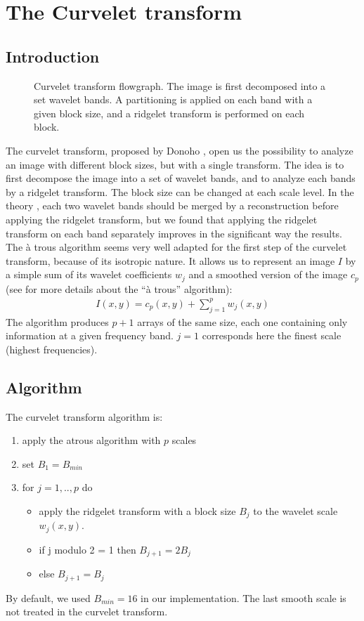 \documentclass[11pt,a4paper]{article}
\begin{document}
\section{The Curvelet transform}
\subsection{Introduction}
\begin{figure}[htb]
\centerline{
\hbox{}}
\caption{Curvelet transform flowgraph. The image 
is first decomposed into a set wavelet bands. A partitioning
is applied on each band with a given block size, and a ridgelet transform
is performed on each block.}
\label{fig_curvelet}
\end{figure}

The curvelet transform, proposed by Donoho \cite{cur:donoho99,cur:candes99_3},
open us the possibility to analyze an image with different block sizes, but
with a single transform. The idea is to first decompose the image into
a set of wavelet bands, and to analyze each bands by a ridgelet transform.
The block size can be changed at each scale level. 
In the theory \cite{cur:donoho99}, each two wavelet bands should be merged
by a reconstruction before applying the ridgelet transform, but we found 
that applying the ridgelet transform on each band separately improves
in the significant way the results. The \`a trous algorithm seems very well
adapted for the first step of the curvelet transform, because of its 
isotropic nature. It allows us to represent an
image $I$ by a simple sum of its wavelet coefficients $w_j$ and a
smoothed version of the image $c_{p}$ (see \cite{starck:book98} for more details
about the ``\`a trous'' algorithm):
\begin{eqnarray}
I(x,y) = c_{p}(x,y) + \sum_{j=1}^{p} w_j(x,y)
\end{eqnarray}
The algorithm produces $p+1$ arrays of the same size, each one
containing only information at a given frequency band. $j=1$ corresponds here
the finest scale (highest frequencies). 

 
\subsection{Algorithm}
The curvelet transform algorithm is:
\begin{enumerate}
\item apply the atrous algorithm with $p$ scales
\item set $B_1 = B_{min}$
\item for $j=1, .., p$ do 
\begin{itemize}
\item apply the ridgelet transform with a block size $B_j$ to 
the wavelet scale $w_j(x,y)$.
\item if j modulo 2 = 1 then $B_{j+1} = 2 B_{j}$
\item else $B_{j+1} = B_{j}$
\end{itemize}
\end{enumerate}
By default, we used $B_{min} = 16$ in our implementation. The last smooth
scale is not treated in the curvelet transform.
\end{document}
